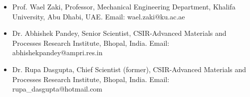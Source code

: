 

\begin{cvparagraph}

\begin{itemize}

\item \textcolor{russell}{Prof. Wael Zaki, Professor, Mechanical Engineering Department, Khalifa University, Abu Dhabi, UAE. Email: wael.zaki@ku.ac.ae}
\item \textcolor{russell}{Dr. Abhishek Pandey, Senior Scientist, CSIR-Advanced Materials and Processes Research Institute, Bhopal, India. Email: abhishekpandey@ampri.res.in}
\item \textcolor{russell}{Dr. Rupa Dasgupta, Chief Scientist (former), CSIR-Advanced Materials and Processes Research Institute, Bhopal, India. Email: rupa\_dasgupta@hotmail.com}

\end{itemize}
\end{cvparagraph}